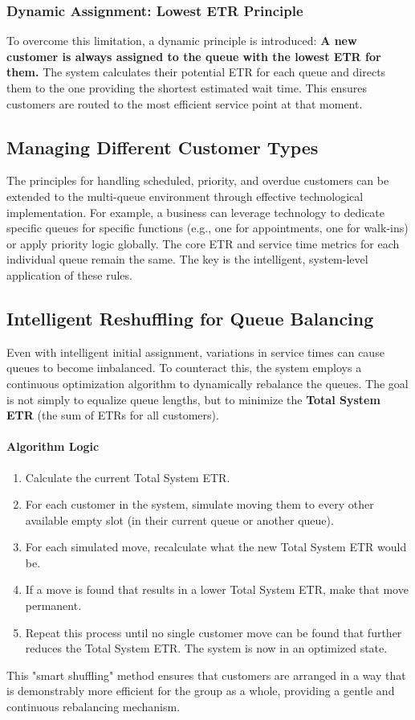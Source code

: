 \documentclass[12pt,a4paper]{report}
\begin{document}
\subsubsection{Dynamic Assignment: Lowest ETR Principle}
To overcome this limitation, a dynamic principle is introduced: \textbf{A new customer is always assigned to the queue with the lowest ETR for them.} The system calculates their potential ETR for each queue and directs them to the one providing the shortest estimated wait time. This ensures customers are routed to the most efficient service point at that moment.

\subsection{Managing Different Customer Types}
The principles for handling scheduled, priority, and overdue customers can be extended to the multi-queue environment through effective technological implementation. For example, a business can leverage technology to dedicate specific queues for specific functions (e.g., one for appointments, one for walk-ins) or apply priority logic globally. The core ETR and service time metrics for each individual queue remain the same. The key is the intelligent, system-level application of these rules.

\subsection{Intelligent Reshuffling for Queue Balancing}
Even with intelligent initial assignment, variations in service times can cause queues to become imbalanced. To counteract this, the system employs a continuous optimization algorithm to dynamically rebalance the queues. The goal is not simply to equalize queue lengths, but to minimize the \textbf{Total System ETR} (the sum of ETRs for all customers).

\paragraph{Algorithm Logic}
\begin{enumerate}
    \item Calculate the current Total System ETR.
    \item For each customer in the system, simulate moving them to every other available empty slot (in their current queue or another queue).
    \item For each simulated move, recalculate what the new Total System ETR would be.
    \item If a move is found that results in a lower Total System ETR, make that move permanent.
    \item Repeat this process until no single customer move can be found that further reduces the Total System ETR. The system is now in an optimized state.
\end{enumerate}
This "smart shuffling" method ensures that customers are arranged in a way that is demonstrably more efficient for the group as a whole, providing a gentle and continuous rebalancing mechanism.
\end{document}
